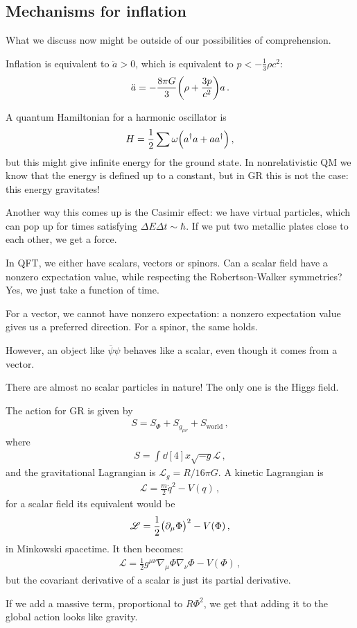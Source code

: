 \documentclass[main.tex]{subfiles}
\begin{document}
\subsection{Mechanisms for inflation}

What we discuss now might be outside of our possibilities of comprehension.

Inflation is equivalent to \(\ddot{a} > 0 \), which is equivalent to \( p< -\frac{1}{3} \rho c^2\): 
%
\begin{align}
  \ddot{a} = - \frac{8 \pi G}{3} \qty(\rho + \frac{3 p}{c^2})a
\,.
\end{align}

A quantum Hamiltonian for a harmonic oscillator is 
%
\begin{align}
  H = \frac{1}{2} \sum \omega \qty(a ^\dag a + a a ^\dag)
\,,
\end{align}
%
but this might give infinite energy for the ground state.
In nonrelativistic QM we know that the energy is defined up to a constant, but in GR this is not the case: this energy gravitates!

Another way this comes up is the Casimir effect: we have virtual particles, which can pop up for times satisfying \(\Delta E \Delta t \sim \hbar\).
If we put two metallic plates close to each other, we get a force.

In QFT, we either have scalars, vectors or spinors.
Can a scalar field have a nonzero expectation value, while respecting the Robertson-Walker symmetries? Yes, we just take a function of time.

For a vector, we cannot have nonzero expectation: a nonzero expectation value gives us a preferred direction.
For a spinor, the same holds.

However, an object like \(\overline{\psi} \psi \) behaves like a scalar, even though it comes from a vector.

There are almost no scalar particles in nature! The only one is the Higgs field.

The action for GR is given by 
%
\begin{align}
  S = S_{\Phi } + S_{g_{\mu \nu }} + S_{\text{world}}
\,,
\end{align}
%
where 
%
\begin{align}
  S = \int \dd[4]{x} \sqrt{-g} \mathscr{L}
\,,
\end{align}
%
and the gravitational Lagrangian is \(\mathscr{L}_g = R /16 \pi G\).
A kinetic Lagrangian is  
%
\begin{align}
  \mathscr{L}  = \frac{m}{2} \dot{q}^2 - V(q)
\,,
\end{align}
%
for a scalar field its equivalent would be 
%
\begin{align}
  \mathscr{L} = \frac{1}{2} \qty(\partial_{\mu } \Phi )^2-V(\Phi )
\,,
\end{align}
%
in Minkowski spacetime. It then becomes: 
%
\begin{align}
  \mathscr{L} = \frac{1}{2} g^{\mu \nu } \nabla_{\mu } \Phi \nabla_{\nu } \Phi - V(\Phi )
\,,
\end{align}
%
but the covariant derivative of a scalar is just its partial derivative.

If we add a massive term, proportional to \(R \Phi^2\), we get that adding it to the global action looks like gravity.
\end{document}
